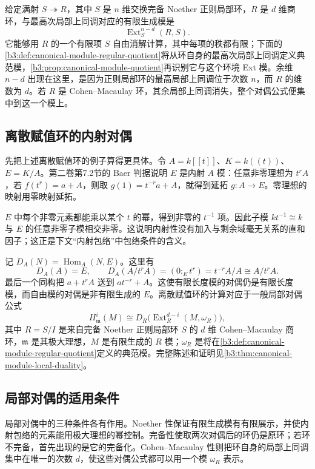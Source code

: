 \ProseParagraphBreak
给定满射 \(S\twoheadrightarrow R\)，其中 \(S\) 是 \(n\) 维交换完备 Noether 正则局部环，\(R\) 是 \(d\) 维商环，与最高次局部上同调对应的有限生成模是
\[
	\operatorname{Ext}_S^{n-d}(R,S).
\]
它能够用 \(R\) 的一个有限项 \(S\) 自由消解计算，其中每项的秩都有限；下面的\cref{b3:def:canonical-module-regular-quotient}将从环自身的最高次局部上同调定义典范模，\cref{b3:prop:canonical-module-quotient}再识别它与这个环境 Ext 模。余维 \(n-d\) 出现在这里，是因为正则局部环的最高局部上同调位于次数 \(n\)，而 \(R\) 的维数为 \(d\)。若 \(R\) 是 Cohen–Macaulay 环，其余局部上同调消失，整个对偶公式便集中到这一个模上。

\subsection{离散赋值环的内射对偶}
\label{b3:subsec:2202:02}

先把上述离散赋值环的例子算得更具体。令 \(A=k[\![t]\!]\)、\(K=k(\!(t)\!)\)、\(E=K/A\)。第二卷第7.2节的 Baer 判据说明 \(E\) 是内射 \(A\) 模：任意非零理想为 \(t^rA\)，若 \(f(t^r)=a+A\)，则取 \(g(1)=t^{-r}a+A\)，就得到延拓 \(g:A\rightarrow E\)。零理想的映射用零映射延拓。

\ProseParagraphBreak
\(E\) 中每个非零元素都能乘以某个 \(t\) 的幂，得到非零的 \(t^{-1}\) 项。因此子模 \(kt^{-1}\cong k\) 与 \(E\) 的任意非零子模相交非零。这说明内射性没有加入与剩余域毫无关系的直和因子；这正是下文“内射包络”中包络条件的含义。

\ProseParagraphBreak
记 \(D_A(N)=\operatorname{Hom}_A(N,E)\)。这里有
\[
	D_A(A)=E, \qquad D_A(A/t^rA)=(0:_Et^r)=t^{-r}A/A\cong A/t^rA.
\]
最后一个同构把 \(a+t^rA\) 送到 \(at^{-r}+A\)。这使有限长度模的对偶仍是有限长度模，而自由模的对偶是非有限生成的 \(E\)。离散赋值环的计算对应于一般局部对偶公式
\[
	H^i_{\mathfrak m}(M) \cong D_R\bigl(\operatorname{Ext}_R^{d-i}(M,\omega_R)\bigr),
\]
其中 \(R=S/I\) 是来自完备 Noether 正则局部环 \(S\) 的 \(d\) 维 Cohen–Macaulay 商环，\(\mathfrak m\) 是其极大理想，\(M\) 是有限生成的 \(R\) 模；\(\omega_R\) 是将在\cref{b3:def:canonical-module-regular-quotient}定义的典范模。完整陈述和证明见\cref{b3:thm:canonical-module-local-duality}。

\subsection{局部对偶的适用条件}
\label{b3:subsec:2202:03}

局部对偶中的三种条件各有作用。Noether 性保证有限生成模有有限展示，并使内射包络的元素能用极大理想的幂控制。完备性使取两次对偶后的环仍是原环；若环不完备，首先出现的是它的完备化。Cohen–Macaulay 性则把环自身的局部上同调集中在唯一的次数 \(d\)，使这些对偶公式都可以用一个模 \(\omega_R\) 表示。

